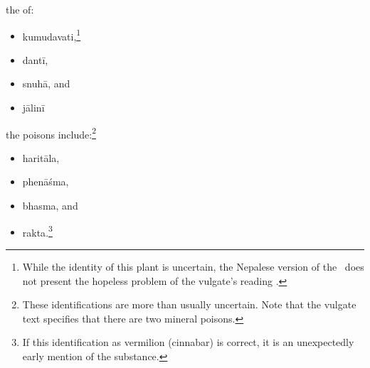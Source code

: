 \begin{translation}
        \item
        the   of:
              \begin{itemize}
        \item \gls{kumudavati},\footnote{While the identity of this plant is 
            uncertain, the Nepalese version of the \SS\ does not present the 
            hopeless problem of the vulgate's reading .}
%
\item \gls{dantī},
\item \gls{snuhā},
and
\item \gls{jālinī}        
            \end{itemize}

        \item
        the   poisons include:\footnote{These identifications
            are more than usually uncertain.  Note that the vulgate
            text specifies that there are two mineral poisons.}
              \begin{itemize}
\item \gls{haritāla},
\item \gls{phenāśma}, 
\item \gls{bhasma}, and
\item \gls{rakta}.\footnote{If this identification as vermilion (cinnabar) is 
correct, it is an unexpectedly early mention of the substance.}        
            \end{itemize}


\end{translation}
